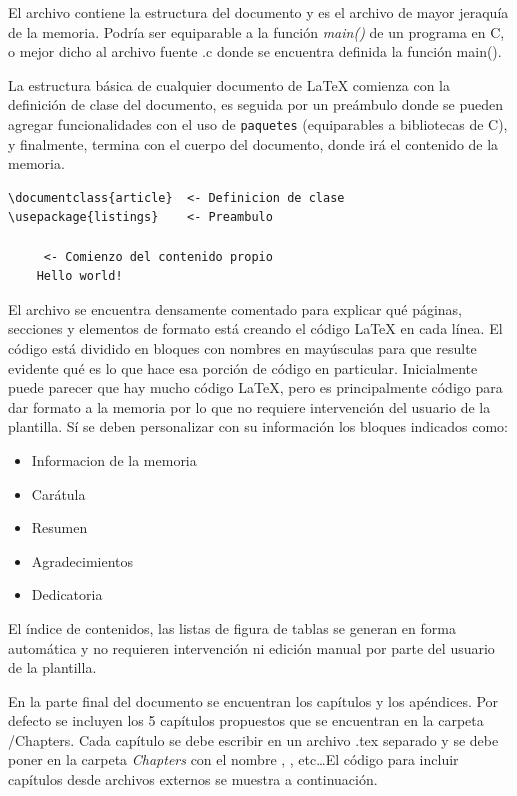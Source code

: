 El archivo  contiene la estructura del documento y es el archivo de mayor jeraquía de la memoria.  Podría ser equiparable a la función \emph{main()} de un programa en C, o mejor dicho al archivo fuente .c donde se encuentra definida la función main().

La estructura básica de cualquier documento de \LaTeX{} comienza con la definición de clase del documento, es seguida por un preámbulo donde se pueden agregar funcionalidades con el uso de \texttt{paquetes} (equiparables a bibliotecas de C), y finalmente, termina con el cuerpo del documento, donde irá el contenido de la memoria.


\begin{lstlisting}
\documentclass{article}  <- Definicion de clase
\usepackage{listings}	 <- Preambulo

	 <- Comienzo del contenido propio 
	Hello world!

\end{lstlisting}


El archivo  se encuentra densamente comentado para explicar qué páginas, secciones y elementos de formato está creando el código \LaTeX{} en cada línea. El código está dividido en bloques con nombres en mayúsculas para que resulte evidente qué es lo que hace esa porción de código en particular. Inicialmente puede parecer que hay mucho código \LaTeX{}, pero es principalmente código para dar formato a la memoria por lo que no requiere intervención del usuario de la plantilla.  Sí se deben personalizar con su información los bloques indicados como:

\begin{itemize}
	\item Informacion de la memoria
	\item Carátula
	\item Resumen
	\item Agradecimientos
	\item Dedicatoria
\end{itemize}

El índice de contenidos, las listas de figura de tablas se generan en forma automática y no requieren intervención ni edición manual por parte del usuario de la plantilla. 

En la parte final del documento se encuentran los capítulos y los apéndices.  Por defecto se incluyen los 5 capítulos propuestos que se encuentran en la carpeta /Chapters. Cada capítulo se debe escribir en un archivo .tex separado y se debe poner en la carpeta \emph{Chapters} con el nombre , , etc\ldots El código para incluir capítulos desde archivos externos se muestra a continuación.

